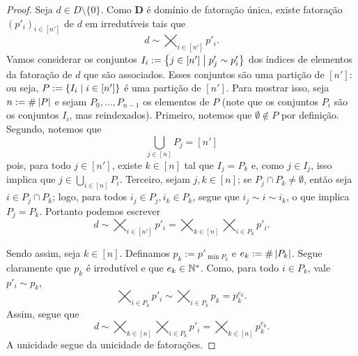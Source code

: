 \begin{proof}
Seja $d \in D \setminus \{0\}$. Como $\bm D$ é domínio de fatoração única, existe fatoração $(p'_i)_{i \in [n']}$ de $d$ em irredutíveis tais que
	\begin{equation*}
	d \sim \bigtimes_{i \in [n']} p'_i.
	\end{equation*}
Vamos considerar os conjuntos $I_i := \left\{{j \in [n']}\;\middle\vert\;{p'_j \sim p'_i}\right\}$ dos índices de elementos da fatoração de $d$ que são associados. Esses conjuntos são uma partição de $[n']$: ou seja, $P := \left\{{I_i}\;\middle\vert\;{i \in [n']}\right\}$ é uma partição de $[n']$. Para mostrar isso, seja $n := \#\left\lvert{P}\right\rvert$ e sejam $P_0,\ldots,P_{n-1}$ os elementos de $P$  (note que os conjuntos $P_i$ são os conjuntos $I_i$, mas reindexados). Primeiro, notemos que $\emptyset \notin P$ por definição. Segundo, notemos que
	\begin{equation*}
	\bigcup_{j \in [n]} P_j = [n']
	\end{equation*}
pois, para todo $j \in [n']$, existe $k \in [n]$ tal que $I_j = P_k$ e, como $j \in I_j$, isso implica que $j \in \bigcup_{i \in [n]} P_i$. Terceiro, sejam $j,k \in [n]$; se $P_j \cap P_k \neq \emptyset$, então seja $i \in P_j \cap P_k$; logo, para todos $i_j \in P_j,i_k \in P_k$, segue que $i_j \sim i \sim i_k$, o que implica $P_j=P_k$. Portanto podemos escrever
	\begin{equation*}
	d \sim \bigtimes_{i \in [n']} p'_i = \bigtimes_{k \in [n]} \bigtimes_{i \in P_k} p'_i.
	\end{equation*}

Sendo assim, seja $k \in [n]$. Definamos $p_k := p'_{\min P_k}$ e $e_k := \#\left\lvert{P_k}\right\rvert$. Segue claramente que $p_k$ é irredutível e que $e_k \in \mathbb{N}^*$. Como, para todo $i \in P_k$, vale $p'_i \sim p_k$,
	\begin{equation*}
	\bigtimes_{i \in P_k} p'_i \sim \bigtimes_{i \in P_k} p_k = p_k^{e_k}.
	\end{equation*}
Assim, segue que
	\begin{equation*}
	d \sim \bigtimes_{k \in [n]} \bigtimes_{i \in P_k} p'_i = \bigtimes_{k \in [n]} p_k^{e_k}.
	\end{equation*}
A unicidade segue da unicidade de fatorações.
\end{proof}

